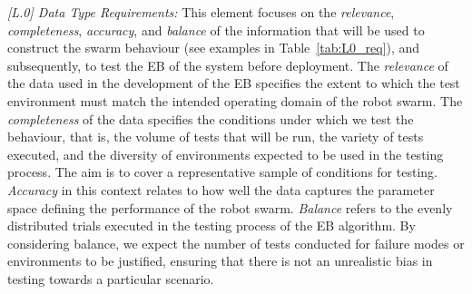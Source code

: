 \documentclass[runningheads]{llncs}
\begin{document}
\emph{[L.0] Data Type Requirements:}
This element focuses on the \emph{relevance}, \emph{completeness}, \emph{accuracy}, and \emph{balance} of the information that will be used to construct the swarm behaviour (see examples in Table~\ref{tab:L0_req}), and subsequently, to test the EB of the system before deployment. The \emph{relevance} of the data used in the development of the EB specifies the extent to which the test environment must match the intended operating domain of the robot swarm. The \emph{completeness} of the data specifies the conditions under which we test the behaviour, that is, the volume of tests that will be run, the variety of tests executed, and the diversity of environments expected to be used in the testing process. The aim is to cover a representative sample of conditions for testing. 
\emph{Accuracy} in this context relates to how well the data captures the parameter space defining the performance of the robot swarm. 
\emph{Balance} refers to the evenly distributed trials executed in the testing process of the EB algorithm. %
By considering balance, we expect the number of tests conducted for failure modes or environments to be justified, ensuring that there is not an unrealistic bias in testing towards a particular scenario. 
%
\end{document}
